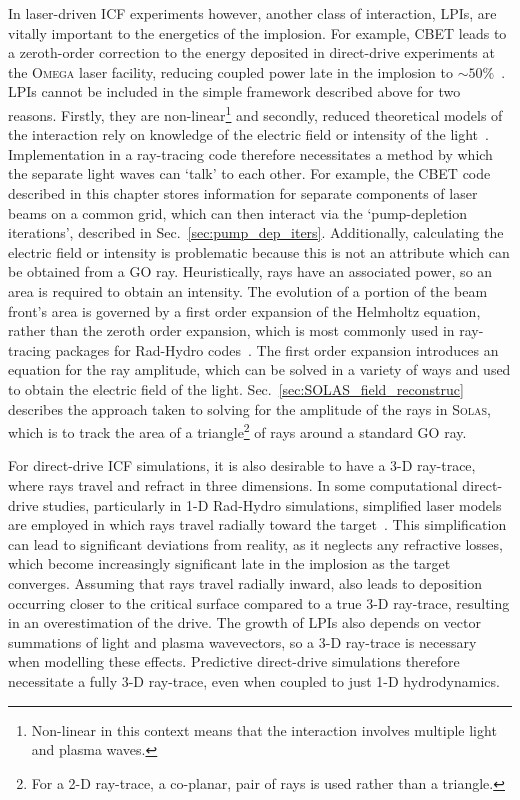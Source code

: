 In laser-driven \ac{ICF} experiments however, another class of interaction, \ac{LPIs}, are vitally important to the energetics of the implosion.
For example, \ac{CBET} leads to a zeroth-order correction to the energy deposited in direct-drive experiments at the \textsc{Omega} laser facility, reducing coupled power late in the implosion to $\sim 50\%$~\cite{colaitis_inverse_2021}.
\ac{LPIs} cannot be included in the simple framework described above for two reasons.
Firstly, they are non-linear\footnote{Non-linear in this context means that the interaction involves multiple light and plasma waves.} and secondly, reduced theoretical models of the interaction rely on knowledge of the electric field or intensity of the light~\cite{randall_theory_1981}.
Implementation in a ray-tracing code therefore necessitates a method by which the separate light waves can `talk' to each other.
For example, the \ac{CBET} code described in this chapter stores information for separate components of laser beams on a common grid, which can then interact via the `pump-depletion iterations', described in Sec.~\ref{sec:pump_dep_iters}.
Additionally, calculating the electric field or intensity is problematic because this is not an attribute which can be obtained from a \ac{GO} ray.
Heuristically, rays have an associated power, so an area is required to obtain an intensity.
The evolution of a portion of the beam front's area is governed by a first order expansion of the Helmholtz equation, rather than the zeroth order expansion, which is most commonly used in ray-tracing packages for \ac{Rad-Hydro} codes~\cite{colaitis_towards_2014}.
The first order expansion introduces an equation for the ray amplitude, which can be solved in a variety of ways and used to obtain the electric field of the light.
Sec.~\ref{sec:SOLAS_field_reconstruc} describes the approach taken to solving for the amplitude of the rays in \textsc{Solas}, which is to track the area of a triangle\footnote{For a 2-D ray-trace, a co-planar, pair of rays is used rather than a triangle.} of rays around a standard \ac{GO} ray.

For direct-drive \ac{ICF} simulations, it is also desirable to have a 3-D ray-trace, where rays travel and refract in three dimensions.
In some computational direct-drive studies, particularly in 1-D \ac{Rad-Hydro} simulations, simplified laser models are employed in which rays travel radially toward the target~\cite{paddock_one-dimensional_2021}.
This simplification can lead to significant deviations from reality, as it neglects any refractive losses, which become increasingly significant late in the implosion as the target converges.
Assuming that rays travel radially inward, also leads to deposition occurring closer to the critical surface compared to a true 3-D ray-trace, resulting in an overestimation of the drive.
The growth of \ac{LPIs} also depends on vector summations of light and plasma wavevectors, so a 3-D ray-trace is necessary when modelling these effects.
Predictive direct-drive simulations therefore necessitate a fully 3-D ray-trace, even when coupled to just 1-D hydrodynamics.


